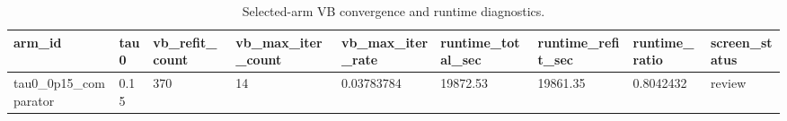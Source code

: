 \begin{table}[t]
\centering
\small
\begin{tabular}{@{}lllllllll@{}}
\toprule
arm\_id & tau0 & vb\_refit\_count & vb\_max\_iter\_count & vb\_max\_iter\_rate & runtime\_total\_sec & runtime\_refit\_sec & runtime\_ratio & screen\_status
\\
\midrule
tau0\_0p15\_comparator & 0.15 & 370 & 14 & 0.03783784 & 19872.53 & 19861.35 & 0.8042432 & review \\
\bottomrule
\end{tabular}
\caption{Selected-arm VB convergence and runtime diagnostics.}
\label{tab:joint-qvp-phase4k-runtime-convergence}
\end{table}
